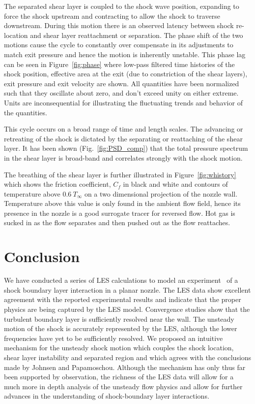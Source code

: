 \documentclass[]{aiaa-tc}%
\begin{document}
The separated shear layer is coupled to the shock wave position, expanding to force the shock upstream and contracting to allow the shock to traverse downstream.  During this motion there is an observed latency between shock re-location and shear layer reattachment or separation.  The phase shift of the two motions cause the cycle to constantly over compensate in its adjustments to match exit pressure and hence the motion is inherently unstable.  This phase lag can be seen in Figure~\ref{fig:phase} where low-pass filtered time histories of the shock position, effective area at the exit (due to constriction of the shear layers), exit pressure and exit velocity are shown.  All quantities have been normalized such that they oscillate about zero, and don't exceed unity on either extreme.  Units are inconsequential for illustrating the fluctuating trends and behavior of the quantities.

This cycle occurs on a broad range of time and length scales.  The advancing or retreating of the shock is dictated by the separating or reattaching of the shear layer.  It has been shown (Fig.~\ref{fig:PSD_comp}) that the total pressure spectrum in the shear layer is broad-band and correlates strongly with the shock motion.

The breathing of the shear layer is further illustrated in Figure~\ref{fig:whistory} which shows the friction coefficient, $C_f$ in black and white and contours of temperature above $0.6 \ T_{\infty}$ on a two dimensional projection of the nozzle wall.  Temperature above this value is only found in the ambient flow field, hence its presence in the nozzle is a good surrogate tracer for reversed flow.  Hot gas is sucked in as the flow separates and then pushed out as the flow reattaches.




\section{Conclusion}
We have conducted a series of LES calculations to model an experiment~\cite{Papam:10} of a shock boundary layer interaction in a planar nozzle.  The LES data show excellent agreement with the reported experimental results and indicate that the proper physics are being captured by the LES model.  Convergence studies show that the turbulent boundary layer is sufficiently resolved near the wall.  The unsteady motion of the shock is accurately represented by the LES, although the lower frequencies have yet to be sufficiently resolved.  We proposed an intuitive mechanism for the unsteady shock motion which couples the shock location, shear layer instability and separated region and which agrees with the conclusions made by Johnsen and Papamoschou.  Although the  mechanism has only thus far been supported by observation, the richness of the LES data will allow for a much more in depth analysis of the unsteady flow physics and allow for further advances in the understanding of shock-boundary layer interactions. 
\end{document}

